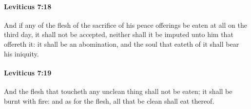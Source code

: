		\paragraph{Leviticus 7:18} %
			\label{LEVITICUS-7-18}

			And if any of the flesh of the sacrifice of his peace offerings be eaten at all on the third day, it shall not be accepted, neither shall it be imputed unto him that offereth it: it shall be an abomination, and the soul that eateth of it shall bear his iniquity.


		\paragraph{Leviticus 7:19} %
			\label{LEVITICUS-7-19}

			And the flesh that toucheth any unclean thing shall not be eaten; it shall be burnt with fire: and as for the flesh, all that be clean shall eat thereof.

